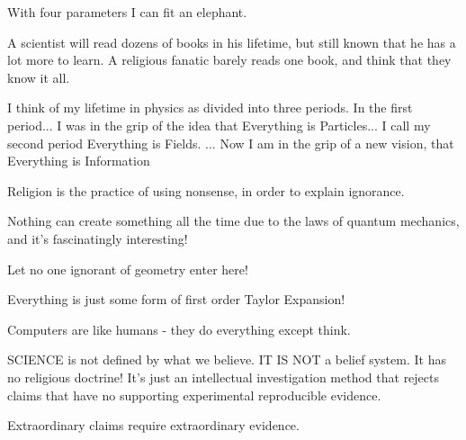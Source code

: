  	\begin{fquote}With four parameters I can fit an elephant.
 	\end{fquote}
 	
 	\begin{fquote}A scientist will read dozens of books in his lifetime, but still known that he has a lot more to learn. A religious fanatic barely reads one book, and think that they know it all.
 	\end{fquote}
 	
 	\begin{fquote}I think of my lifetime in physics as divided into three periods. In the first period... I was in the grip of the idea that Everything is Particles... I call my second period Everything is Fields. ... Now I am in the grip of a new vision, that Everything is Information 
 	\end{fquote}
 	
 	\begin{fquote}Religion is the practice of using nonsense, in order to explain ignorance.
 	\end{fquote}
 	
 	\begin{fquote}Nothing can create something all the time due to the laws of quantum mechanics, and it's fascinatingly interesting!
 	\end{fquote}
 	
 	\begin{fquote}[Plato]Let no one ignorant of geometry enter here!
 	\end{fquote}
 	
 	\begin{fquote}Everything is just some form of first order Taylor Expansion!\end{fquote}
 	
 	\begin{fquote}Computers are like humans - they do everything except think.
 	\end{fquote}
 	
 	\begin{fquote}SCIENCE is not defined by what we believe. IT IS NOT a belief system. It has no religious doctrine! It's just an intellectual investigation method that rejects claims that have no supporting experimental reproducible evidence.
 	\end{fquote}
 	
 	\begin{fquote} Extraordinary claims require extraordinary evidence.
 	\end{fquote}
 	
